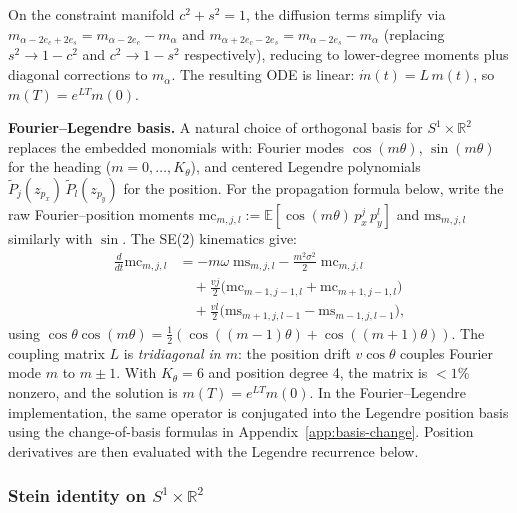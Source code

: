 \documentclass{article}
\newcommand{\R}{\mathbb{R}}
\newcommand{\E}{\mathbb{E}}
\theoremstyle{definition}
\begin{document}
On the constraint manifold $c^2 + s^2 = 1$, the diffusion terms
simplify via $m_{\alpha-2e_c+2e_s} = m_{\alpha-2e_c} - m_\alpha$
and $m_{\alpha+2e_c-2e_s} = m_{\alpha-2e_s} - m_\alpha$
(replacing $s^2 \to 1 - c^2$ and $c^2 \to 1 - s^2$ respectively),
reducing to lower-degree moments plus diagonal corrections to $m_\alpha$.
The resulting ODE is linear:
$\dot{m}(t) = L\,m(t)$,
so $m(T) = e^{LT}m(0)$.

\textbf{Fourier--Legendre basis.}
A natural choice of orthogonal basis for $S^1 \times \R^2$ replaces
the embedded monomials with:
Fourier modes $\cos(m\theta)$, $\sin(m\theta)$ for the heading
($m = 0, \ldots, K_\theta$),
and centered Legendre polynomials $\widetilde{P}_{j}(z_{p_x})\,\widetilde{P}_{l}(z_{p_y})$
for the position.
For the propagation formula below, write the raw Fourier--position moments
$\mathrm{mc}_{m,j,l} := \E[\cos(m\theta)\, p_x^j\, p_y^l]$
and $\mathrm{ms}_{m,j,l}$ similarly with $\sin$.
The SE(2) kinematics give:
\begin{align}
    \frac{d}{dt}\mathrm{mc}_{m,j,l}
    &= -m\omega\;\mathrm{ms}_{m,j,l}
    - \frac{m^2\sigma^2}{2}\;\mathrm{mc}_{m,j,l}
    \nonumber\\
    &\quad + \frac{vj}{2}\bigl(\mathrm{mc}_{m-1,j-1,l} + \mathrm{mc}_{m+1,j-1,l}\bigr)
    \nonumber\\
    &\quad + \frac{vl}{2}\bigl(\mathrm{ms}_{m+1,j,l-1} - \mathrm{ms}_{m-1,j,l-1}\bigr),
    \label{eq:fourier-ode}
\end{align}
using $\cos\theta\cos(m\theta) = \frac{1}{2}(\cos((m{-}1)\theta) + \cos((m{+}1)\theta))$.
The coupling matrix $L$ is \emph{tridiagonal in $m$}:
the position drift $v\cos\theta$ couples Fourier mode $m$ to $m \pm 1$.
With $K_\theta = 6$ and position degree 4, the matrix is
${<}1\%$ nonzero, and the solution is $m(T) = e^{LT} m(0)$.
In the Fourier--Legendre implementation, the same operator is conjugated
into the Legendre position basis using the change-of-basis formulas in
Appendix~\ref{app:basis-change}. Position derivatives are then evaluated
with the Legendre recurrence below.

\subsubsection{Stein identity on \texorpdfstring{$S^1 \times \R^2$}{S1 x R2}}
\label{app:se2-stein}
\end{document}

